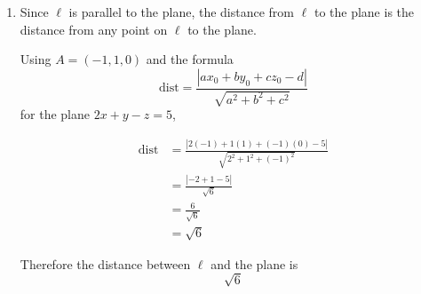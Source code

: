 \documentclass[leqno]{article}
\begin{document}
\begin{enumerate}[
  label=\textbf{\arabic*.},
  leftmargin=*,
  topsep=0pt,
  partopsep=0pt,
  parsep=0pt
]
\begin{tcolorbox}[colback=white, colframe=scarlet, title={\textbf{Solution}}, breakable, grow to left by=6mm, grow to right by=10mm]
\begin{enumerate}[label=\textbf{(\alph*)}]
\begin{enumerate}[label=\textbf{(\roman*)}]
The line $\ell$ has direction vector
\[
\mathbf d=
\begin{pmatrix}
1\\
-1\\
1
\end{pmatrix}
\]

Now
\begin{align*}
\mathbf d\cdot \mathbf n
&=
\begin{pmatrix}
1\\
-1\\
1
\end{pmatrix}
\cdot
\begin{pmatrix}
2\\
1\\
-1
\end{pmatrix}\\
&=1(2)+(-1)(1)+1(-1)\\
&=2-1-1\\
&=0
\end{align*}

So $\ell$ is either parallel to the plane or lies in the plane.

Take the point $A=(-1,1,0)$ on $\ell$. Substituting into the plane equation,
\[
2(-1)+1-0=-1
\]
which is not equal to $5$.

So $A$ is not on the plane, hence $\ell$ does not lie in the plane.

Therefore $\ell$ is parallel to the plane $2x+y-z=5$.

    \item Since $\ell$ is parallel to the plane, the distance from $\ell$ to the plane is the distance from any point on $\ell$ to the plane.

Using $A=(-1,1,0)$ and the formula
\[
\mathrm{dist}
=\frac{|ax_0+by_0+cz_0-d|}{\sqrt{a^2+b^2+c^2}}
\]
for the plane $2x+y-z=5$,

\begin{align*}
\mathrm{dist}
&=\frac{|2(-1)+1(1)+(-1)(0)-5|}{\sqrt{2^2+1^2+(-1)^2}}\\
&=\frac{|-2+1-5|}{\sqrt{6}}\\
&=\frac{6}{\sqrt6}\\
&=\sqrt6
\end{align*}

Therefore the distance between $\ell$ and the plane is
\[
\sqrt6
\]
  \end{enumerate}
\end{enumerate}
\end{tcolorbox}


\newpage


\end{enumerate}
\end{document}
